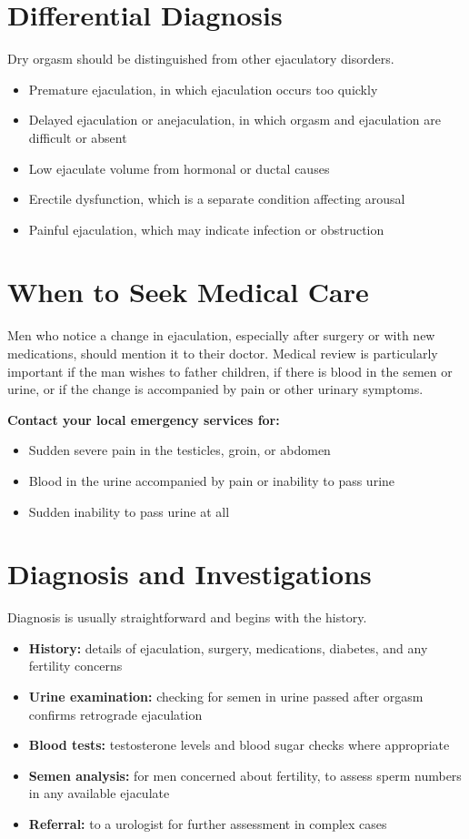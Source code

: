 \section*{Differential Diagnosis}
Dry orgasm should be distinguished from other ejaculatory disorders.
\begin{itemize}
    \item Premature ejaculation, in which ejaculation occurs too quickly
    \item Delayed ejaculation or anejaculation, in which orgasm and ejaculation are difficult or absent
    \item Low ejaculate volume from hormonal or ductal causes
    \item Erectile dysfunction, which is a separate condition affecting arousal
    \item Painful ejaculation, which may indicate infection or obstruction
\end{itemize}

\section*{When to Seek Medical Care}
Men who notice a change in ejaculation, especially after surgery or with new medications, should mention it to their doctor. Medical review is particularly important if the man wishes to father children, if there is blood in the semen or urine, or if the change is accompanied by pain or other urinary symptoms.

\textbf{Contact your local emergency services for:}
\begin{itemize}
    \item Sudden severe pain in the testicles, groin, or abdomen
    \item Blood in the urine accompanied by pain or inability to pass urine
    \item Sudden inability to pass urine at all
\end{itemize}

\section*{Diagnosis and Investigations}
Diagnosis is usually straightforward and begins with the history.
\begin{itemize}
    \item \textbf{History:} details of ejaculation, surgery, medications, diabetes, and any fertility concerns
    \item \textbf{Urine examination:} checking for semen in urine passed after orgasm confirms retrograde ejaculation
    \item \textbf{Blood tests:} testosterone levels and blood sugar checks where appropriate
    \item \textbf{Semen analysis:} for men concerned about fertility, to assess sperm numbers in any available ejaculate
    \item \textbf{Referral:} to a urologist for further assessment in complex cases
\end{itemize}

